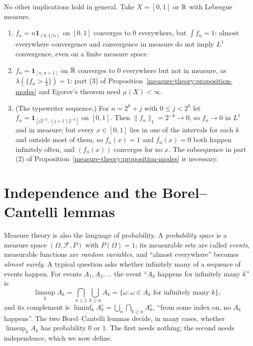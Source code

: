 \begin{counterexample}\label{measure-theory:counterexample-modes}
No other implications hold in general. Take $X = [0, 1]$ or $\mathbb{R}$ with Lebesgue measure.
\begin{enumerate}
\item $f_n = n\mathbf{1}_{(0, 1/n)}$ on $[0, 1]$ converges to $0$ everywhere, but $\int f_n = 1$: almost everywhere convergence and convergence in measure do not imply $L^1$ convergence, even on a finite measure space.
\item $f_n = \mathbf{1}_{[n, n+1]}$ on $\mathbb{R}$ converges to $0$ everywhere but not in measure, as $\lambda(\{f_n > \frac12\}) = 1$: part (3) of Proposition~\ref{measure-theory:proposition-modes} and Egorov's theorem need $\mu(X) < \infty$.
\item (The typewriter sequence.) For $n = 2^k + j$ with $0 \leq j < 2^k$ let $f_n = \mathbf{1}_{[j2^{-k}, (j+1)2^{-k}]}$ on $[0, 1]$. Then $\|f_n\|_1 = 2^{-k} \to 0$, so $f_n \to 0$ in $L^1$ and in measure; but every $x \in [0, 1]$ lies in one of the
intervals for each $k$ and outside most of them, so $f_n(x) = 1$ and $f_n(x) = 0$ both happen infinitely often, and $(f_n(x))$ converges for no $x$. The subsequence in part (2) of
Proposition~\ref{measure-theory:proposition-modes} is necessary.
\end{enumerate}
\end{counterexample}

\section{Independence and the Borel--Cantelli lemmas}\label{measure-theory:section-borel-cantelli}

Measure theory is also the language of probability. A \emph{probability space} is a measure space $(\Omega, \mathcal{F}, P)$ with $P(\Omega) = 1$; its measurable sets are called \emph{events}, measurable
functions are \emph{random variables}, and ``almost everywhere'' becomes \emph{almost surely}. A typical question asks whether infinitely many of a sequence of events happen. For events $A_1, A_2, \ldots$
the event ``$A_k$ happens for infinitely many $k$'' is
\[
\limsup_kA_k = \bigcap_{n \geq 1}\bigcup_{k \geq n}A_k = \{\omega : \omega \in A_k \text{ for infinitely many } k\},
\]
and its complement is $\liminf_kA_k^c = \bigcup_n\bigcap_{k \geq n}A_k^c$, ``from some index on, no $A_k$ happens''. The two Borel--Cantelli lemmas decide, in many cases, whether $\limsup_kA_k$ has probability
$0$ or $1$. The first needs nothing; the second needs independence, which we now define.


